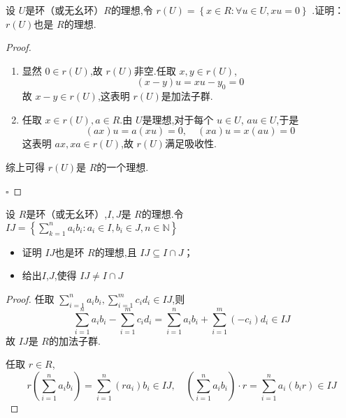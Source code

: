 \documentclass[lang=cn,12pt,color=green,fontset=none,pad]{elegantbook}
\begin{document}
\begin{problemset}
    \item 设 \(  U  \)是环（或无幺环）\(  R  \)的理想,令 \(  r\left( U \right) =  \left\{  x \in R: \forall u \in U,xu= 0 \right\}   \)   .证明： \(  r\left( U \right)   \)也是 \(  R  \)的理想.
        \begin{proof}
            \begin{enumerate}
                \item 显然 \(  0 \in r\left( U \right)   \),故 \(  r\left( U \right)   \)非空.任取 \(  x,y \in r\left( U \right)   \), \[
                    \left( x-y \right)u =  xu-y_0 =  0 
                    \]故 \(  x-y \in r\left( U \right)   \),这表明 \(  r\left( U \right)   \)是加法子群.
                \item 任取 \(  x \in r\left( U \right),a \in R   \).由 \(  U  \)是理想,对于每个 \(  u \in U  \), \(  au \in U  \),于是  \[
                \left( ax \right)u  = a\left( xu \right)=  0,\quad  \left( xa \right)u =  x\left( au \right) =  0   
                \] 这表明 \(  ax,xa \in r\left( U \right)   \),故 \(  r\left( U \right)   \)满足吸收性.  
            \end{enumerate}
            综上可得 \(  r\left( U \right)   \)是 \(  R  \)的一个理想.  
        
            \hfill $\square$
        \end{proof}  


    \item 设 \(  R  \)是环（或无幺环）,\(  I,J  \)是 \(  R  \)的理想.令 \(  I J=  \left\{ \sum _{k= 1}^{n}a_{i}b_{i}: a_{i}\in I,b_{i}\in J,n \in \mathbb{N}  \right\}  \)
    \begin{itemize}
        \item 证明 \(  I J  \)也是环 \(  R  \)的理想,且 \(  I J\subseteq I\cap J  \)；
        \item 给出\(  I  \),\(  J  \),使得 \(  I J \neq  I \cap J  \)      
    \end{itemize}

        \begin{proof}
            
            
            任取 \(  \sum _{i= 1}^{n}a_{i}b_{i} ,\sum _{i= 1}^{m}c_{i}d _{i} \in  I J  \),则 \[
            \sum _{i= 1}^{n}a_{i}b_{i} -\sum _{i= 1}^{m}c _{i} d _{i} =  \sum _{i= 1}^{n}a_{i}b_{i}+ \sum _{i= 1}^{m}\left( -c_{i} \right)d _{i} \in I J 
            \] 故 \(   I J  \)是 \(  R  \)的加法子群.
            
            任取 \(  r \in R  \), \[
            r\left( \sum _{i= 1}^{n}a_{i}b_{i} \right)  =  \sum _{i= 1}^{n} \left( ra_{i} \right)b_{i} \in I J,\quad  \left( \sum _{i= 1}^{n}a_{i}b_{i} \right)\cdot  r =  \sum _{i= 1}^{n} a_{i}\left( b_{i} r  \right) \in I J    
            \]
           

\end{proof}
\end{problemset}
\end{document}
